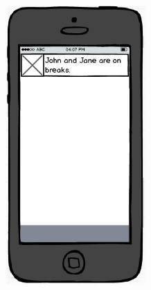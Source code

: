 \documentclass[8pt,a4paper]{report}
\begin{document}
\medskip
\centering
\includegraphics[width=0.4\textwidth]{Mobile.png}
\end{document}
